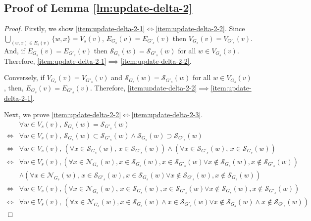 \subsection{Proof of Lemma \ref{lm:update-delta-2}}
\begin{proof}
  Firstly, we show \ref{item:update-delta-2-1}$\iff$\ref{item:update-delta-2-2}.
  Since $\bigcup_{(w,x)\in E_s(v)}\{w,x\}=V_s(v)$, $E_{G_s}(v)=E_{G'_s}(v)$ then $V_{G_s}(v)=V_{G'_s}(v)$.
  And, if $E_{G_s}(v)=E_{G'_s}(v)$ then $\mathcal{S}_{G_s}(w)=\mathcal{S}_{G'_s}(w)$ for all $w\in V_{G_s}(v)$. Therefore, \ref{item:update-delta-2-1}$\implies$\ref{item:update-delta-2-2}.

  Conversely, if $V_{G_s}(v)=V_{G'_s}(v)$ and $\mathcal{S}_{G_s}(w)=\mathcal{S}_{G'_s}(w)$ for all $w\in V_{G_s}(v)$, then, $E_{G_s}(v)=E_{G'_s}(v)$.
  Therefore, \ref{item:update-delta-2-2}$\implies$\ref{item:update-delta-2-1}.

  Next, we prove \ref{item:update-delta-2-2}$\iff$\ref{item:update-delta-2-3}.
  \begin{equation*}
    \begin{aligned}
      &\forall w\in V_s(v),\,\mathcal{S}_{G_s}(w)=\mathcal{S}_{G'_s}(w)\\
      \iff&\forall w\in V_s(v),\,\mathcal{S}_{G_s}(w)\subset\mathcal{S}_{G'_s}(w)
      \land\mathcal{S}_{G_s}(w)\supset\mathcal{S}_{G'_s}(w)\\
      \iff&\forall w\in V_s(v),
      \,\left(\forall x\in\mathcal{S}_{G_s}(w),\,x\in\mathcal{S}_{G'_s}(w)\right)
      \land\left(\forall x\in\mathcal{S}_{G'_s}(w),\,x\in\mathcal{S}_{G_s}(w)\right)\\
      \iff&\forall w\in V_s(v),
      \left(\forall x\in\mathcal{N}_{G_s}(w),x\in\mathcal{S}_{G_s}(w),x\in\mathcal{S}_{G'_s}(w)\right.
      \left.\lor x\notin\mathcal{S}_{G_s}(w),x\notin\mathcal{S}_{G'_s}(w)\right)\\
      &\land\left(\forall x\in\mathcal{N}_{G_s}(w),\,x\in\mathcal{S}_{G'_s}(w),x\in\mathcal{S}_{G_s}(w)\right.
      \left.\lor x\notin\mathcal{S}_{G'_s}(w),x\notin\mathcal{S}_{G_s}(w)\right)\\
      \iff&\forall w\in V_s(v),
      \left(\forall x\in\mathcal{N}_{G_s}(w),\,
      x\in\mathcal{S}_{G_s}(w),x\in\mathcal{S}_{G'_s}(w)\right.
      \left.\lor x\notin\mathcal{S}_{G_s}(w),x\notin\mathcal{S}_{G'_s}(w)\right)\\
      \iff&\forall w\in V_s(v),\,\left(\forall x\in\mathcal{N}_{G_s}(w),\right.
      \left.x\in\mathcal{S}_{G_s}(w)\land x\in\mathcal{S}_{G'_s}(w)\right.
      \left.\lor x\notin\mathcal{S}_{G_s}(w)\land x\notin\mathcal{S}_{G'_s}(w)\right)
    \end{aligned}
  \end{equation*}
\end{proof}

